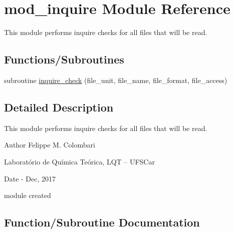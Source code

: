 \hypertarget{namespacemod__inquire}{}\section{mod\+\_\+inquire Module Reference}
\label{namespacemod__inquire}


This module performs inquire checks for all files that will be read.  


\subsection*{Functions/\+Subroutines}
\begin{DoxyCompactItemize}
\item 
subroutine \hyperlink{namespacemod__inquire_a404416015b424b2545d556f51ed67af8}{inquire\+\_\+check} (file\+\_\+unit, file\+\_\+name, file\+\_\+format, file\+\_\+access)
\end{DoxyCompactItemize}


\subsection{Detailed Description}
This module performs inquire checks for all files that will be read. 

\begin{DoxyAuthor}{Author}
Felippe M. Colombari
\begin{DoxyItemize}
\item Laboratório de Química Teórica, L\+QT -- U\+F\+S\+Car 
\end{DoxyItemize}
\end{DoxyAuthor}
\begin{DoxyDate}{Date}
-\/ Dec, 2017
\begin{DoxyItemize}
\item module created 
\end{DoxyItemize}
\end{DoxyDate}


\subsection{Function/\+Subroutine Documentation}
